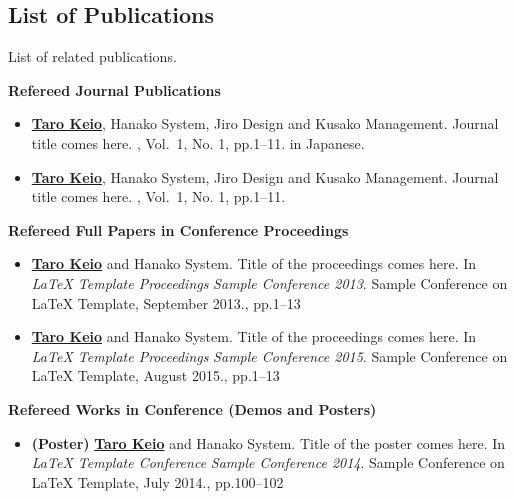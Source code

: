 \begin{singlespace}
  \chapter*{List of Publications}
  List of related publications.
  \begin{center}
    \textbf{Refereed Journal Publications}
  \end{center}
  \begin{itemize}
    \item
      \underline{\bfseries Taro Keio}, Hanako System, Jiro Design and Kusako Management.
      \newblock Journal title comes here.
      , Vol.~1, No. 1, pp.1--11.
      \newblock in Japanese.

    \item
      \underline{\bfseries Taro Keio}, Hanako System, Jiro Design and Kusako Management.
      \newblock Journal title comes here.
      , Vol.~1, No. 1, pp.1--11.
  \end{itemize}
  \begin{center}
    \textbf{Refereed Full Papers in Conference Proceedings}
  \end{center}
  \begin{itemize}
    \item
      \underline{\bfseries Taro Keio} and Hanako System.
      \newblock Title of the proceedings comes here.
      \newblock In {\em LaTeX Template Proceedings} {\em Sample Conference 2013}. Sample Conference on LaTeX Template, September 2013., pp.1--13

    \item
      \underline{\bfseries Taro Keio} and Hanako System.
      \newblock Title of the proceedings comes here.
      \newblock In {\em LaTeX Template Proceedings} {\em Sample Conference 2015}. Sample Conference on LaTeX Template, August 2015., pp.1--13
  \end{itemize}

  \begin{center}
    \textbf{Refereed Works in Conference (Demos and Posters)}
  \end{center}
  \begin{itemize}
    \item \textbf{(Poster)}
      \underline{\bfseries Taro Keio} and Hanako System.
      \newblock Title of the poster comes here.
      \newblock In {\em LaTeX Template Conference} {\em Sample Conference 2014}. Sample Conference on LaTeX Template, July 2014., pp.100--102


\end{itemize}
\end{singlespace}
